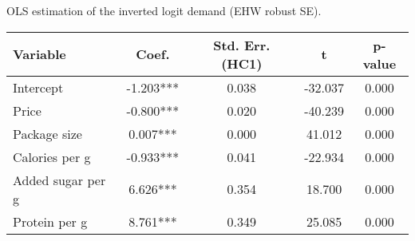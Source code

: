 \begin{table}[H]
\centering
\caption{OLS estimation of the inverted logit demand (EHW robust SE).}
\label{tab:q3_ols_ehw}
\end{table}
\begin{tabular}{lcccc}
\toprule
Variable & Coef. & Std. Err. (HC1) & t & p-value \\
\midrule
Intercept & -1.203*** & 0.038 & -32.037 & 0.000 \\
Price & -0.800*** & 0.020 & -40.239 & 0.000 \\
Package size & 0.007*** & 0.000 & 41.012 & 0.000 \\
Calories per g & -0.933*** & 0.041 & -22.934 & 0.000 \\
Added sugar per g & 6.626*** & 0.354 & 18.700 & 0.000 \\
Protein per g & 8.761*** & 0.349 & 25.085 & 0.000 \\
\bottomrule
\end{tabular}
